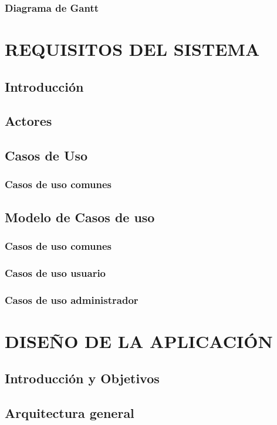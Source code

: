 \documentclass[12pt, a4paper, twoside]{book}
\begin{document}
	\subsection{Diagrama de Gantt}

	\chapter{REQUISITOS DEL SISTEMA}
	\section{Introducción}
	\section{Actores}
	\section{Casos de Uso}
	\subsection{Casos de uso comunes}		 
	\section{Modelo de Casos de uso}
	\subsection{Casos de uso comunes}
	\subsection{Casos de uso usuario}
	\subsection{Casos de uso administrador}
	\chapter{DISEÑO DE LA APLICACIÓN}
	\section{Introducción y Objetivos}
	
	\section{Arquitectura general}
	
\end{document}
